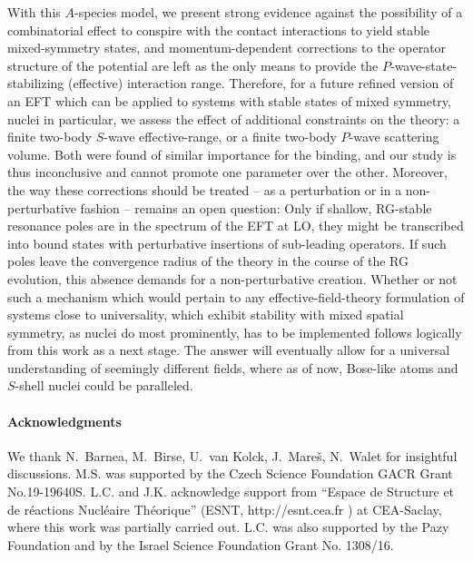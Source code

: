\documentclass[preprint,12pt]{elsarticle}
\newcommand{\lc}{\ensuremath{\Lambda_c}}
\newcommand{\red}[1]{\textcolor{red}{#1}}
\newcommand{\ie}{\textit{i.e.}~}
\begin{document}
With this $A$-species model, we present strong evidence against the possibility of a combinatorial effect
to conspire with the contact interactions to yield stable
mixed-symmetry states, and momentum-dependent corrections to the operator structure of the potential are
left as the only means to provide the $P$-wave-state-stabilizing (effective) interaction range.
Therefore, for a future refined version of an EFT which can be applied to systems with stable states of mixed symmetry,
nuclei in particular, we assess the effect of additional constraints on the theory: a finite two-body $S$-wave effective-range,
or a finite two-body $P$-wave scattering volume. 
Both were found of similar importance for the binding, and our study is thus inconclusive and cannot promote one parameter over the other.
Moreover, the way these corrections should be treated -- as a perturbation or in a non-perturbative fashion -- remains an open question:
Only if shallow, RG-stable resonance poles are in the spectrum of the EFT at LO,
they might be transcribed into bound states with perturbative insertions of sub-leading operators.
If such poles leave the convergence radius of the theory in the course of the RG evolution, this absence demands
for a non-perturbative creation.
Whether or not such a mechanism which would pertain to any effective-field-theory formulation of systems close to universality,
which exhibit stability with mixed spatial symmetry, as nuclei do most prominently, has to be implemented follows logically from
this work as a next stage. The answer will eventually allow for a universal understanding of seemingly different fields, where as of now,
Bose-like atoms and $S$-shell nuclei could be paralleled.

\paragraph*{Acknowledgments}
We thank N.~Barnea,  M.~Birse, U.~van Kolck, J.~Mare\v{s}, N.~Walet for insightful
discussions.
M.S. was supported by the Czech Science Foundation GACR Grant No.19-19640S.
L.C. and J.K. acknowledge support from ``Espace de Structure et de r\'eactions
Nucl\'eaire Th\'eorique''  (ESNT, http://esnt.cea.fr )  at CEA-Saclay, where this work
was partially carried out.
L.C. was also supported by the Pazy Foundation and by the
Israel Science Foundation Grant No. 1308/16.






\end{document}

